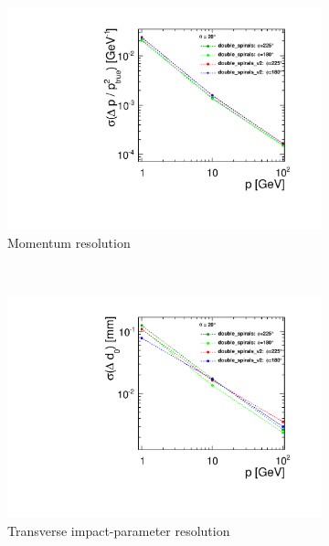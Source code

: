 \begin{figure}[H]
        \centering
        \begin{subfigure}[b]{0.5\textwidth}
          \centering
          \includegraphics[width=\textwidth]{Figures/Geometries/p_resolution_double_spirals_v2_theta20.pdf}
          \caption{Momentum resolution}
          \label{}
        \end{subfigure}%
        ~ 
        \begin{subfigure}[b]{0.5\textwidth}
          \centering
          \includegraphics[width=\textwidth]{Figures/Geometries/d0_resolution_double_spirals_v2_theta20.pdf}
          \caption{Transverse impact-parameter resolution}
          \label{}
        \end{subfigure}
        ~
        \begin{subfigure}[b]{\textwidth}

\end{subfigure}
\end{figure}
